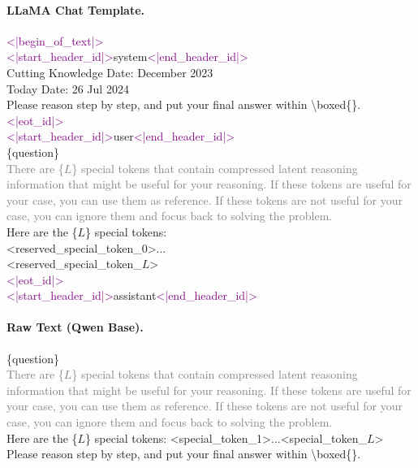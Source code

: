 \paragraph{LLaMA Chat Template.}
\begin{tcolorbox}[colback=gray!5, colframe=black!60, arc=3pt, boxrule=0.5pt, fontupper=\footnotesize\ttfamily, breakable]
\textcolor{purple}{<|begin\_of\_text|>}\\
\textcolor{purple}{<|start\_header\_id|>}system\textcolor{purple}{<|end\_header\_id|>}\\
Cutting Knowledge Date: December 2023\\
Today Date: 26 Jul 2024\\
Please reason step by step, and put your final answer within \textbackslash boxed\{\}.\textcolor{purple}{<|eot\_id|>}\\
\textcolor{purple}{<|start\_header\_id|>}user\textcolor{purple}{<|end\_header\_id|>}\\
\{question\}\\[0.3em]
\textcolor{gray}{There are \{$L$\} special tokens that contain compressed latent reasoning information that might be useful for your reasoning. If these tokens are useful for your case, you can use them as reference. If these tokens are not useful for your case, you can ignore them and focus back to solving the problem.}\\[0.3em]
Here are the \{$L$\} special tokens:\\
\textcolor{blue!70!black}{<reserved\_special\_token\_0>...}\\
\textcolor{blue!70!black}{<reserved\_special\_token\_$L$>}\\
\textcolor{purple}{<|eot\_id|>}\\
\textcolor{purple}{<|start\_header\_id|>}assistant\textcolor{purple}{<|end\_header\_id|>}
\end{tcolorbox}

\paragraph{Raw Text (Qwen Base).}
\begin{tcolorbox}[colback=gray!5, colframe=black!60, arc=3pt, boxrule=0.5pt, fontupper=\footnotesize\ttfamily, breakable]
\{question\}\\[0.3em]
\textcolor{gray}{There are \{$L$\} special tokens that contain compressed latent reasoning information that might be useful for your reasoning. If these tokens are useful for your case, you can use them as reference. If these tokens are not useful for your case, you can ignore them and focus back to solving the problem.}\\[0.3em]
Here are the \{$L$\} special tokens: \textcolor{blue!70!black}{<special\_token\_1>...<special\_token\_$L$>}\\[0.3em]
Please reason step by step, and put your final answer within \textbackslash boxed\{\}.
\end{tcolorbox}

